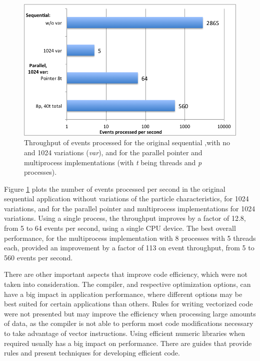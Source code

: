 \begin{figure}[!htp]
	\begin{center}
		\includegraphics[scale=0.55]{charts/events_per_sec.png}
		\caption{Throughput of events processed for the original sequential \tth,with no and 1024 variations (\textit{var}), and for the parallel pointer and multiprocess implementations (with \textit{t} being threads and \textit{p} processes).}
		\label{fig:events_sec}
	\end{center}
\end{figure}

Figure \ref{fig:events_sec} plots the number of events processed per second in the original sequential application without variations of the particle characteristics, for 1024 variations, and for the parallel pointer and multiprocess implementations for 1024 variations. Using a single process, the throughput improves by a factor of 12.8, from 5 to 64 events per second, using a single CPU device. The best overall performance, for the multiprocess implementation with 8 processes with 5 threads each, provided an improvement by a factor of 113 on event throughput, from 5 to 560 events per second.

There are other important aspects that improve code efficiency, which were not taken into consideration. The compiler, and respective optimization options, can have a big impact in application performance, where different options may be best suited for certain applications than others. Rules for writing vectorized code were not presented but may improve the efficiency when processing large amounts of data, as the compiler is not able to perform most code modifications necessary to take advantage of vector instructions. Using efficient numeric libraries\cite{MKL,BLAS} when required usually has a big impact on performance. There are guides that provide rules and present techniques for developing efficient code\cite{Intel:Optimization,Intel:DevOptimization,NUMA}.

